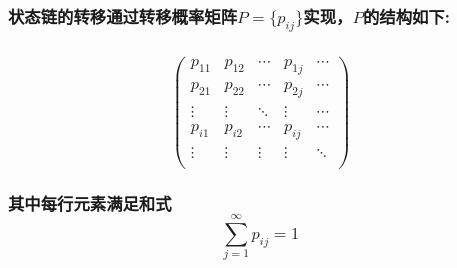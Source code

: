 \documentclass[11pt]{article}
\begin{document}
\subsubsection{\texorpdfstring{状态链的转移通过转移概率矩阵\(P=\{p_{ij}\}\)实现，\(P\)的结构如下:}{状态链的转移通过转移概率矩阵P=\textbackslash{}\{p\_\{ij\}\textbackslash{}\}实现，P的结构如下:}}\label{ux72b6ux6001ux94feux7684ux8f6cux79fbux901aux8fc7ux8f6cux79fbux6982ux7387ux77e9ux9635pp_ijux5b9eux73b0pux7684ux7ed3ux6784ux5982ux4e0b}

\subsubsection{\texorpdfstring{\[
        \left (\begin{matrix}
        p_{11} & p_{12} & \cdots &p_{1j}& \cdots  \\
        p_{21}  & p_{22} & \cdots &p_{2j}& \cdots \\
        \vdots & \vdots & \ddots & \vdots & \cdots \\
        p_{i1} & p_{i2} & \cdots & p_{ij} & \cdots \\
        \vdots & \vdots & \vdots & \vdots & \ddots \\
        \end{matrix} \right)
  \]}{
        \textbackslash{}left (\textbackslash{}begin\{matrix\}
        p\_\{11\} \& p\_\{12\} \& \textbackslash{}cdots \&p\_\{1j\}\& \textbackslash{}cdots  \textbackslash{}\textbackslash{}
        p\_\{21\}  \& p\_\{22\} \& \textbackslash{}cdots \&p\_\{2j\}\& \textbackslash{}cdots \textbackslash{}\textbackslash{}
        \textbackslash{}vdots \& \textbackslash{}vdots \& \textbackslash{}ddots \& \textbackslash{}vdots \& \textbackslash{}cdots \textbackslash{}\textbackslash{}
        p\_\{i1\} \& p\_\{i2\} \& \textbackslash{}cdots \& p\_\{ij\} \& \textbackslash{}cdots \textbackslash{}\textbackslash{}
        \textbackslash{}vdots \& \textbackslash{}vdots \& \textbackslash{}vdots \& \textbackslash{}vdots \& \textbackslash{}ddots \textbackslash{}\textbackslash{}
        \textbackslash{}end\{matrix\} \textbackslash{}right)
  }}\label{left-beginmatrix-p_11-p_12-cdots-p_1j-cdots-p_21-p_22-cdots-p_2j-cdots-vdots-vdots-ddots-vdots-cdots-p_i1-p_i2-cdots-p_ij-cdots-vdots-vdots-vdots-vdots-ddots-endmatrix-right}

\subsubsection{\texorpdfstring{其中每行元素满足和式\[\sum_{j=1}^{\infty} p_{ij}=1\]}{其中每行元素满足和式\textbackslash{}sum\_\{j=1\}\^{}\{\textbackslash{}infty\} p\_\{ij\}=1}}\label{ux5176ux4e2dux6bcfux884cux5143ux7d20ux6ee1ux8db3ux548cux5f0fsum_j1infty-p_ij1}
\end{document}
